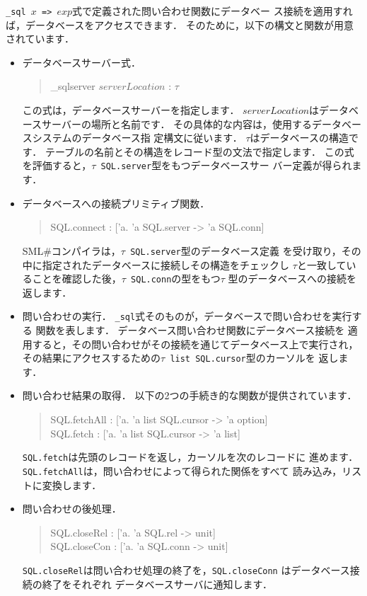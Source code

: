 \documentclass{jbook}
\newcommand{\smlsharp}{SML\#}
\newenvironment{program}{\begin{quote}\begin{tt}}%
                        {\end{tt}\end{quote}}
\begin{document}
\ifjp%
	{\tt \_sql $x$ => $exp$}式で定義された問い合わせ関数にデータベー
ス接続を適用すれば，データベースをアクセスできます．
	そのために，以下の構文と関数が用意されています．
\begin{itemize}
\item データベースサーバー式．
\begin{program}
\_sqlserver $serverLocation$ : $\tau$
\end{program}
	この式は，データベースサーバーを指定します．
	$serverLocation$はデータベースサーバーの場所と名前です．
	その具体的な内容は，使用するデータベースシステムのデータベース指
定構文に従います．
	$\tau$はデータベースの構造です．
	テーブルの名前とその構造をレコード型の文法で指定します．
	この式を評価すると，{\tt $\tau$ SQL.server}型をもつデータベースサー
バー定義が得られます．
\item データベースへの接続プリミティブ関数．
\begin{program}
SQL.connect : ['a. 'a SQL.server -> 'a SQL.conn]
\end{program}
	\smlsharp{}コンパイラは，{\tt $\tau$ SQL.server}型のデータベース定義
を受け取り，その中に指定されたデータベースに接続しその構造をチェックし
$\tau$と一致していることを確認した後，{\tt $\tau$ SQL.conn}の型をもつ$\tau$
型のデータベースへの接続を返します．
	
\item 問い合わせの実行．
	{\tt \_sql}式そのものが，データベースで問い合わせを実行する
関数を表します．
	データベース問い合わせ関数にデータベース接続を
適用すると，その問い合わせがその接続を通じてデータベース上で実行され，
その結果にアクセスするための{\tt $\tau$ list SQL.cursor}型のカーソルを
返します．

\item 問い合わせ結果の取得．
	以下の2つの手続き的な関数が提供されています．
\begin{program}
SQL.fetchAll : ['a. 'a list SQL.cursor -> 'a option]\\
SQL.fetch : ['a. 'a list SQL.cursor -> 'a list]
\end{program}
	{\tt SQL.fetch}は先頭のレコードを返し，カーソルを次のレコードに
進めます．
	{\tt SQL.fetchAll}は，問い合わせによって得られた関係をすべて
読み込み，リストに変換します．
\item 問い合わせの後処理．
\begin{program}
SQL.closeRel : ['a. 'a SQL.rel -> unit]\\
SQL.closeCon : ['a. 'a SQL.conn -> unit]
\end{program}
	{\tt SQL.closeRel}は問い合わせ処理の終了を，{\tt SQL.closeConn}
はデータベース接続の終了をそれぞれ
データベースサーバに通知します．
\end{itemize}
\end{document}
